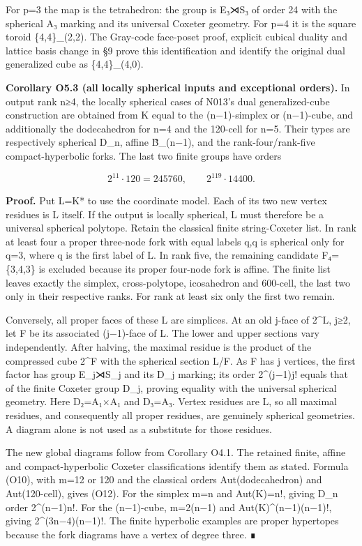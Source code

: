 \documentclass[
  10pt,
  letterpaper,
]{article}
\begin{document}
For p=3 the map is the tetrahedron: the group is E₃⋊S₃ of order 24 with
the spherical A₃ marking and its universal Coxeter geometry. For p=4 it
is the square toroid \{4,4\}\_(2,2). The Gray-code face-poset proof,
explicit cubical duality and lattice basis change in §9 prove this
identification and identify the original dual generalized cube as
\{4,4\}\_(4,0).

\textbf{Corollary O5.3 (all locally spherical inputs and exceptional
orders).} In output rank n≥4, the locally spherical cases of N013's dual
generalized-cube construction are obtained from K equal to the
(n−1)-simplex or (n−1)-cube, and additionally the dodecahedron for n=4
and the 120-cell for n=5. Their types are respectively spherical D\_n,
affine B̃\_(n−1), and the rank-four/rank-five compact-hyperbolic forks.
The last two finite groups have orders

\[
2^{11}\cdot120=245760,
\qquad 2^{119}\cdot14400.
\tag{O12}
\]

\textbf{Proof.} Put L=K* to use the coordinate model. Each of its two
new vertex residues is L itself. If the output is locally spherical, L
must therefore be a universal spherical polytope. Retain the classical
finite string-Coxeter list. In rank at least four a proper three-node
fork with equal labels q,q is spherical only for q=3, where q is the
first label of L. In rank five, the remaining candidate F₄=\{3,4,3\} is
excluded because its proper four-node fork is affine. The finite list
leaves exactly the simplex, cross-polytope, icosahedron and 600-cell,
the last two only in their respective ranks. For rank at least six only
the first two remain.

Conversely, all proper faces of these L are simplices. At an old j-face
of 2\^{}L, j≥2, let F be its associated (j−1)-face of L. The lower and
upper sections vary independently. After halving, the maximal residue is
the product of the compressed cube 2\^{}F with the spherical section
L/F. As F has j vertices, the first factor has group E\_j⋊S\_j and its
D\_j marking; its order 2\^{}(j−1)j! equals that of the finite Coxeter
group D\_j, proving equality with the universal spherical geometry. Here
D₂=A₁×A₁ and D₃=A₃. Vertex residues are L, so all maximal residues, and
consequently all proper residues, are genuinely spherical geometries. A
diagram alone is not used as a substitute for those residues.

The new global diagrams follow from Corollary O4.1. The retained finite,
affine and compact-hyperbolic Coxeter classifications identify them as
stated. Formula (O10), with m=12 or 120 and the classical orders
\textbar Aut(dodecahedron) and
\textbar Aut(120-cell), gives (O12). For the simplex m=n
and \textbar Aut(K)\textbar=n!, giving D\_n order 2\^{}(n−1)n!. For the
(n−1)-cube, m=2(n−1) and \textbar Aut(K)\^{}(n−1)(n−1)!,
giving 2\^{}(3n−4)(n−1)!. The finite hyperbolic examples are proper
hypertopes because the fork diagrams have a vertex of degree three. ∎
\end{document}
